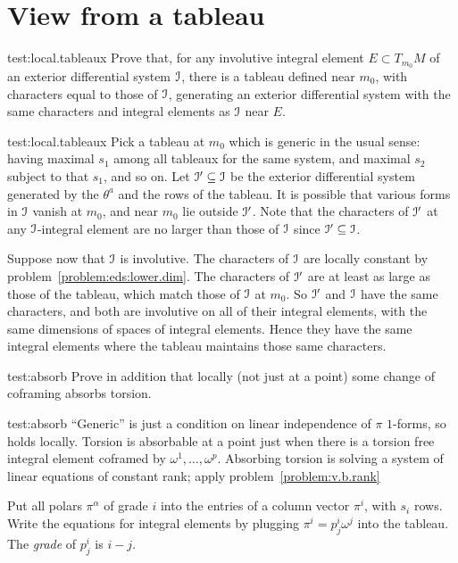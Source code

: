 \section{View from a tableau}
\begin{problem}{test:local.tableaux}
Prove that, for any involutive integral element \(E\subset T_{m_0} M\) of an exterior differential system \(\mathcal{I}\),  there is a tableau defined near \(m_0\), with characters equal to those of \(\mathcal{I}\), generating an exterior differential system with the same characters and integral elements as \(\mathcal{I}\) near \(E\).
\end{problem}
\begin{answer}{test:local.tableaux}
Pick a tableau at \(m_0\) which is generic in the usual sense:  having maximal \(s_1\) among all tableaux for the same system, and maximal \(s_2\) subject to that \(s_1\), and so on.
Let \(\mathcal{I}'\subseteq\mathcal{I}\) be the exterior differential system generated by  the \(\theta^a\) and the rows of the tableau.
It is possible that various forms in \(\mathcal{I}\) vanish at \(m_0\), and near \(m_0\) lie outside \(\mathcal{I}'\).
Note that the characters of \(\mathcal{I}'\) at any \(\mathcal{I}\)-integral element are no larger than those of \(\mathcal{I}\) since \(\mathcal{I}'\subseteq\mathcal{I}\).

Suppose now that \(\mathcal{I}\) is involutive.
The characters of \(\mathcal{I}\) are locally constant by problem~\vref{problem:eds:lower.dim}.
The characters of \(\mathcal{I}'\) are at least as large as those of the tableau, which match those of \(\mathcal{I}\) at \(m_0\).
So \(\mathcal{I}'\) and \(\mathcal{I}\) have the same characters, and both are involutive on all of their integral elements, with the same dimensions of spaces of integral elements.
Hence they have the same integral elements where the tableau maintains those same characters.
\end{answer}
\begin{problem}{test:absorb}
Prove in addition that locally (not just at a point) some change of coframing absorbs torsion.
\end{problem}
\begin{answer}{test:absorb}
``Generic'' is just a condition on linear independence of \(\pi\) \(1\)-forms, so holds locally.
Torsion is absorbable at a point just when there is a torsion free integral element coframed by \(\omega^1,\dots,\omega^p\).
Absorbing torsion is solving a system of linear equations of constant rank; apply problem~\vref{problem:v.b.rank}
\end{answer}
Put all polars \(\pi^{\alpha}\) of grade \(i\) into the entries of a column vector \(\pi^i\), with \(s_i\) rows.
Write the equations for integral elements by plugging \(\pi^i=p^i_j\omega^j\) into the tableau.
The \emph{grade} of \(p^i_j\) is \(i-j\).

